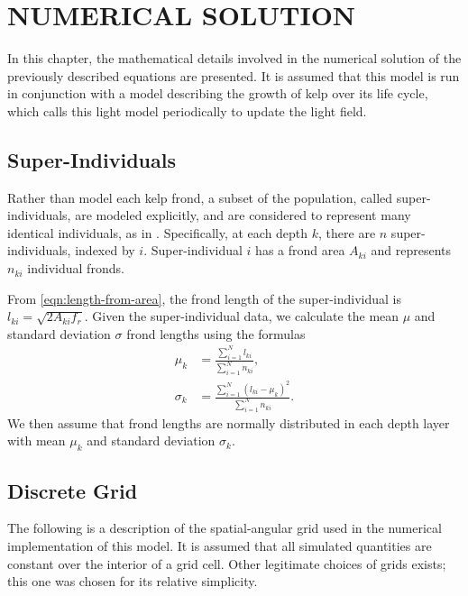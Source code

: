 \documentclass[ms,cpyr,lof,lot]{uathesis}
\newcommand{\ds}{\displaystyle}
\begin{document}
 \chapter{NUMERICAL SOLUTION}
\label{chap:numerical}

In this chapter, the mathematical details involved in the numerical solution of the previously described equations are presented.
It is assumed that this model is run in conjunction with a model describing the growth of kelp over its life cycle, which calls this light model periodically to update the light field.

\section{Super-Individuals}
\label{sec:si}

Rather than model each kelp frond, a subset of the population, called super-individuals, are modeled explicitly, and are considered to represent many identical individuals, as in \citep{scheffer_super-individuals_1994}.
Specifically, at each depth $k$, there are $n$ super-individuals, indexed by $i$.
Super-individual $i$ has a frond area $A_{ki}$ and represents $n_{ki}$ individual fronds.

From \eqref{eqn:length-from-area}, the frond length of the super-individual is $l_{ki} = \sqrt{2A_{ki}f_r}$.
Given the super-individual data, we calculate the mean $\mu$ and standard deviation $\sigma$ frond
lengths using the formulas
\begin{align}
  \mu_k &= \frac{\ds \sum_{i=1}^N l_{ki}}{\ds \sum_{i=1}^N n_{ki}},
  \label{eqn:si_mean} \\
  \sigma_k &= \frac{\ds \sum_{i=1}^N \left( l_{ki} - \mu_k \right)^2}{\ds \sum_{i=1}^N n_{ki}}.
  \label{eqn:si_std}
\end{align}
We then assume that frond lengths are normally distributed in each depth layer
with mean $\mu_k$ and standard deviation $\sigma_k$.

\section{Discrete Grid}
\label{sec:grid}

The following is a description of the spatial-angular grid used in the numerical implementation of this model.
It is assumed that all simulated quantities are constant over the interior of a grid cell.
Other legitimate choices of grids exists; this one was chosen for its relative simplicity.
\end{document}
